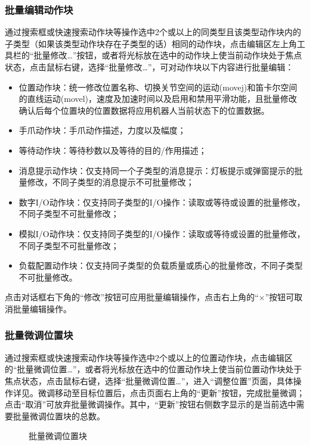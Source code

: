 \subsubsection{批量编辑动作块}
通过搜索框或快速搜索动作块等操作选中2个或以上的同类型且该类型动作块内的子类型（如果该类型动作块存在子类型的话）相同的动作块，点击编辑区左上角工具栏的“批量修改…”按钮，或者将光标放在选中的动作块上使当前动作块处于焦点状态，点击鼠标右键，选择“批量修改…”，可对动作块以下内容进行批量编辑：
\begin{itemize}
\item 位置动作块：统一修改位置名称、切换关节空间的运动(movej)和笛卡尔空间的直线运动(movel)，速度及加速时间以及启用和禁用平滑功能，且批量修改确认后每个位置块的位置数据将应用机器人当前状态下的位置数据。
\item 手爪动作块：手爪动作描述，力度以及幅度；
\item 等待动作块：等待秒数以及等待的目的/作用描述；
\item 消息提示动作块：仅支持同一个子类型的消息提示：灯板提示或弹窗提示的批量修改，不同子类型的消息提示不可批量修改；
\item 数字I/O动作块：仅支持同子类型的I/O操作：读取或等待或设置的批量修改，不同子类型不可批量修改；
\item 模拟I/O动作块：仅支持同子类型的I/O操作：读取或等待或设置的批量修改，不同子类型不可批量修改；
\item 负载配置动作块：仅支持同子类型的负载质量或质心的批量修改，不同子类型不可批量修改。
\end{itemize}

点击对话框右下角的“修改”按钮可应用批量编辑操作，点击右上角的“$\times$”按钮可取消批量编辑操作。


\subsubsection{批量微调位置块}
通过搜索框或快速搜索动作块等操作选中2个或以上的位置动作块，点击编辑区的“批量微调位置…”，或者将光标放在选中的位置动作块上使当前位置动作块处于焦点状态，点击鼠标右键，选择“批量微调位置…”，进入“调整位置”页面，具体操作详见。微调移动至目标位置后，点击页面右上角的“更新”按钮，完成批量微调；点击“取消”可放弃批量微调操作。其中，“更新”按钮右侧数字显示的是当前选中需要批量微调位置块的总数。

\begin{figure}[ht]
	\centering
	\color{red}{缺图}
	\caption{批量微调位置块}
	\label{fig:批量微调位置块}
\end{figure}

